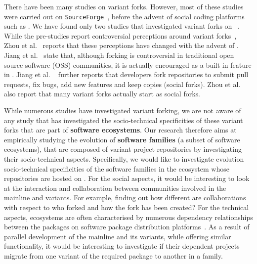 There have been many studies on variant forks. However, most of these studies were carried out on \texttt{SourceForge}~\cite{Linus:2012Perspectives,Gregorio:2012,Viseur:2012Forks,Linus:2013CodeForking,Laurent:2008,Linus:2011ToFork}, before the advent of social coding platforms such as \gh.
We have found only two studies that investigated variant forks on \gh~\cite{businge2018appfamilies,Zhou:2020}.
While the pre-\gh studies report controversial perceptions around variant forks~\cite{Chua:Forking:2017,Dixion:2009Forks,Ernst:2010,Linus:2011ToFork,Linus:2014Hackers,Raymond:Cathedral:2001}, Zhou et al.~\cite{Zhou:2020} reports that these perceptions have changed with the advent of \gh. Jiang et al.~\cite{Lo:2017} state that, although forking is controversial in traditional open source software (OSS) communities, it is actually encouraged as a built-in feature in \gh. Jiang et al. ~\cite{Lo:2017} further reports that developers fork repositories to submit pull requests, fix bugs, add new features and keep copies (social forks).
Zhou et al.~\cite{Zhou:2020} also report that many variant forks actually start as social forks.

While numerous studies have investigated variant forking, we are not aware of any study that has investigated the socio-technical specificities of these variant forks that are part of \textbf{software ecosystems}.
Our research therefore aims at empirically studying the evolution of \textbf{software families} (a subset of software ecosystems), that are composed of variant project repositories by investigating their socio-technical aspects. Specifically, we would like to investigate evolution socio-technical specificities of the software families in the \js ecosystem whose repositories are hosted on \gh.
For the social aspects, it would be interesting to look at the interaction and collaboration between communities involved in the mainline and variants.
For example, finding out how different are collaborations with respect to who forked and how the fork has been created?
For the technical aspects, ecosystems are often characterised by numerous dependency relationships between the packages on software package distribution platforms~\cite{decan:2016:ECSAW}. 
As a result of parallel development of the mainline and its variants, while offering similar functionality, it would be interesting to investigate if their dependent projects migrate from one variant of the required package to another in a family.

